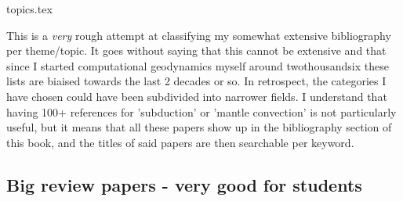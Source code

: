 
\begin{flushright} {\tiny {\color{gray} topics.tex}} \end{flushright}

This is a {\it very} rough attempt at classifying my somewhat extensive 
bibliography per theme/topic.
It goes without saying that this cannot be extensive and that since I 
started computational geodynamics myself around twothousandsix these lists are 
biaised towards the last 2 decades or so. 
In retrospect, the categories I have chosen could have been subdivided
into narrower fields. I understand that having 100+ references 
for 'subduction'  or 'mantle convection' is not particularly useful, 
but it means that all these papers show up in the bibliography section 
of this book, and the titles of said papers are then searchable per keyword.

\subsection{Big review papers - very good for students}

